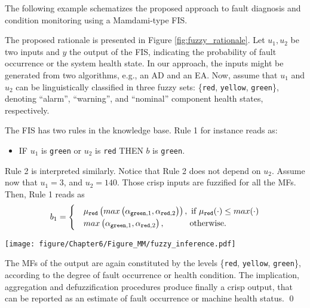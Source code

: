 The following example schematizes the proposed approach to fault diagnosis and condition monitoring using a Mamdami-type FIS.
\begin{example}\label{example:FIS_diagnostic}
The proposed rationale is presented in Figure \ref{fig:fuzzy_rationale}. Let $u_1, u_2$ be two inputs and $y$ the output of the FIS, indicating the probability of fault occurrence or the system health state. In our approach, the inputs might be generated from two algorithms, e.g., an AD and an EA. Now, assume that $u_1$ and $u_2$ can be linguistically classified in three fuzzy sets: \{\texttt{red}, \texttt{yellow}, \texttt{green}\}, denoting ``alarm'', ``warning'', {and} ``nominal'' component health states, {respectively}.


The FIS has two rules in the knowledge base. Rule 1 for instance reads as: 
\begin{itemize}
\item IF $u_1$ is \texttt{green} or  $u_2$ is \texttt{red} THEN  $b$ is \texttt{green}.
\end{itemize}
Rule 2 is interpreted similarly. Notice that Rule 2 does not depend on $u_2$. 
Assume now that $u_1=3$, and $u_2=140$.
Those crisp inputs are fuzzified for all the MFs. Then, Rule 1 reads as
%
\begin{equation}
b_1 = 
\begin{cases}
& \mu_{\texttt{red}}\left(max\left(\alpha_{\texttt{green}, 1}, \alpha_{\texttt{red}, 2}\right)  \right), \mbox{ if } \mu_{\texttt{red}}(\cdot) \leq max(\cdot)  \\
& max\left(\alpha_{\texttt{green}, 1}, \alpha_{\texttt{red}, 2}\right), \mbox{\qquad\quad otherwise.} \nonumber
\end{cases}
\end{equation}


 
 
 
\begin{figure*}[!ht]
    \centering
    \texttt{[image: figure/Chapter6/Figure\_MM/fuzzy\_inference.pdf]}
    \caption{Rationale of the proposed FIS for fault diagnosis and condition monitoring.}
    \label{fig:fuzzy_rationale}
\end{figure*}



The MFs of the output are again constituted by the levels  \{\texttt{red}, \texttt{yellow}, \texttt{green}\}, according to the degree of fault occurrence or health condition. The implication, aggregation and defuzzification procedures produce finally a crisp output, that can be reported as an estimate of fault occurrence or machine health status.
\qed
\end{example}



